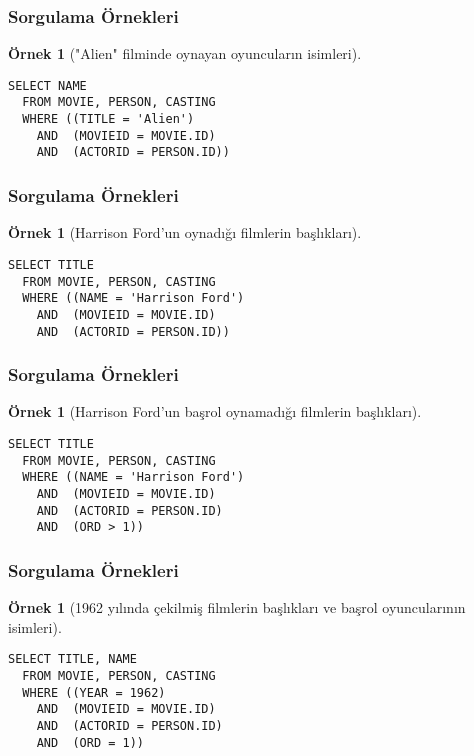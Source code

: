 \documentclass[dvipsnames]{beamer}
\theoremstyle{definition}
\theoremstyle{example}
\newtheorem{ornek}[theorem]{Örnek}
\theoremstyle{plain}
\begin{document}
\begin{frame}[fragile]
  \frametitle{Sorgulama Örnekleri}

  \begin{ornek}["Alien" filminde oynayan oyuncuların isimleri]
     \begin{lstlisting}
SELECT NAME
  FROM MOVIE, PERSON, CASTING
  WHERE ((TITLE = 'Alien')
    AND  (MOVIEID = MOVIE.ID)
    AND  (ACTORID = PERSON.ID))
      \end{lstlisting}
    \end{ornek}
\end{frame}

\begin{frame}[fragile]
  \frametitle{Sorgulama Örnekleri}

  \begin{ornek}[Harrison Ford'un oynadığı filmlerin başlıkları]
    \begin{lstlisting}
SELECT TITLE
  FROM MOVIE, PERSON, CASTING
  WHERE ((NAME = 'Harrison Ford')
    AND  (MOVIEID = MOVIE.ID)
    AND  (ACTORID = PERSON.ID))
    \end{lstlisting}
  \end{ornek}
\end{frame}

\begin{frame}[fragile]
  \frametitle{Sorgulama Örnekleri}

  \begin{ornek}[Harrison Ford'un başrol oynamadığı filmlerin başlıkları]
    \begin{lstlisting}
SELECT TITLE
  FROM MOVIE, PERSON, CASTING
  WHERE ((NAME = 'Harrison Ford')
    AND  (MOVIEID = MOVIE.ID)
    AND  (ACTORID = PERSON.ID)
    AND  (ORD > 1))
    \end{lstlisting}
  \end{ornek}
\end{frame}

\begin{frame}[fragile]
  \frametitle{Sorgulama Örnekleri}

  \begin{ornek}[1962 yılında çekilmiş filmlerin başlıkları ve başrol
                oyuncularının isimleri]
    \begin{lstlisting}
SELECT TITLE, NAME
  FROM MOVIE, PERSON, CASTING
  WHERE ((YEAR = 1962)
    AND  (MOVIEID = MOVIE.ID)
    AND  (ACTORID = PERSON.ID)
    AND  (ORD = 1))
    \end{lstlisting}
  \end{ornek}
\end{frame}
\end{document}
